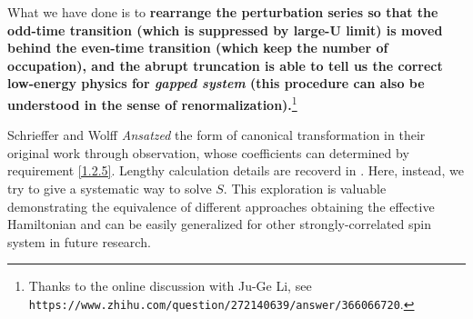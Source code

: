 \documentclass[aps,prx,superscriptaddress,onecolumn,preprintnumbers,nofootinbib,longbibliography]{revtex4-1}
\begin{document}
		What we have done is to \textbf{\color{red}rearrange the perturbation series so that the odd-time transition (which is suppressed by large-U limit) is moved behind the even-time transition (which keep the number of occupation), and the abrupt truncation is able to tell us the correct low-energy physics for \emph{gapped system} (this procedure can also be understood in the sense of renormalization).}\footnote{Thanks to the online discussion with Ju-Ge Li, see \texttt{https://www.zhihu.com/question/272140639/answer/366066720}.}\par
		Schrieffer and Wolff \emph{Ansatzed} the form of canonical transformation in their original work \cite{schrieffer1966relation} through observation, whose coefficients can determined by requirement \eqref{1.2.5}. Lengthy calculation details are recoverd in \cite{phillips2012advanced}. Here, instead, we try to give a systematic way to solve $S$. This exploration is valuable demonstrating the equivalence of different approaches obtaining the effective Hamiltonian and can be easily generalized for other strongly-correlated spin system in future research.\par
\end{document}
